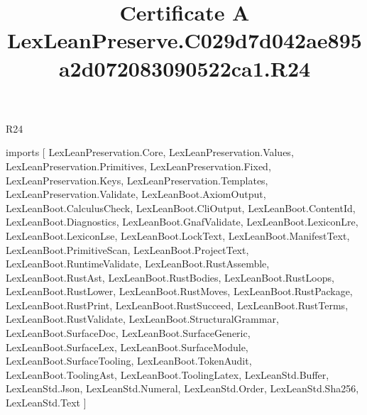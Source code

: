 \begin{lexlean}{R24}
\title{Certificate A LexLeanPreserve.C029d7d042ae895a2d072083090522ca1.R24}
\begin{coremodule}
imports [
  LexLeanPreservation.Core,
  LexLeanPreservation.Values,
  LexLeanPreservation.Primitives,
  LexLeanPreservation.Fixed,
  LexLeanPreservation.Keys,
  LexLeanPreservation.Templates,
  LexLeanPreservation.Validate,
  LexLeanBoot.AxiomOutput,
  LexLeanBoot.CalculusCheck,
  LexLeanBoot.CliOutput,
  LexLeanBoot.ContentId,
  LexLeanBoot.Diagnostics,
  LexLeanBoot.GnafValidate,
  LexLeanBoot.LexiconLre,
  LexLeanBoot.LexiconLse,
  LexLeanBoot.LockText,
  LexLeanBoot.ManifestText,
  LexLeanBoot.PrimitiveScan,
  LexLeanBoot.ProjectText,
  LexLeanBoot.RuntimeValidate,
  LexLeanBoot.RustAssemble,
  LexLeanBoot.RustAst,
  LexLeanBoot.RustBodies,
  LexLeanBoot.RustLoops,
  LexLeanBoot.RustLower,
  LexLeanBoot.RustMoves,
  LexLeanBoot.RustPackage,
  LexLeanBoot.RustPrint,
  LexLeanBoot.RustSucceed,
  LexLeanBoot.RustTerms,
  LexLeanBoot.RustValidate,
  LexLeanBoot.StructuralGrammar,
  LexLeanBoot.SurfaceDoc,
  LexLeanBoot.SurfaceGeneric,
  LexLeanBoot.SurfaceLex,
  LexLeanBoot.SurfaceModule,
  LexLeanBoot.SurfaceTooling,
  LexLeanBoot.TokenAudit,
  LexLeanBoot.ToolingAst,
  LexLeanBoot.ToolingLatex,
  LexLeanStd.Buffer,
  LexLeanStd.Json,
  LexLeanStd.Numeral,
  LexLeanStd.Order,
  LexLeanStd.Sha256,
  LexLeanStd.Text
]


\end{coremodule}
\end{lexlean}
